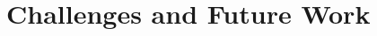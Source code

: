 \documentclass[thesis.tex]{subfiles}
\begin{document}
\section{Challenges and Future Work}
\begin{comment}
Color calibration

There are mainly two modules responsible for the color-rendering accuracy of a digital camera: the former is the illuminant estimation and correction module, and the latter is the color matrix transformation aimed to adapt the color response of the sensor to a standard color space. These two modules together form what may be called the color correction pipeline.

RGB is a device-dependent color model: different devices detect or reproduce a given RGB value differently, since the color elements (such as phosphors or dyes) and their response to the individual R, G, and B levels vary from manufacturer to manufacturer, or even in the same device over time. Thus an RGB value does not define the same color across devices without some kind of color management.
\url{http://www.cis.rit.edu/~jxj1770/publications/paperEI_Xerox.pdf}
\url{http://www.cs.unc.edu/techreports/04-012.pdf}


\end{comment}
\end{document}
